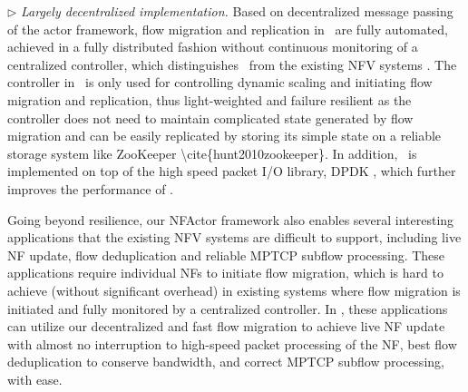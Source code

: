 

$\triangleright$ {\em Largely decentralized implementation.} Based on decentralized message passing of the actor framework, flow migration and replication in \nfactor~are fully automated, achieved in a fully distributed fashion without continuous monitoring of a centralized controller, which distinguishes \nfactor~from the existing NFV systems \cite{gember2015opennf}. The controller in \nfactor~is \ac{only used for controlling dynamic scaling and initiating flow migration and replication,}
thus light-weighted and failure resilient \ac{as the controller does not need to maintain complicated state generated by flow migration and can be easily replicated by storing its simple state on a reliable storage system like ZooKeeper \cite{hunt2010zookeeper}}.
In addition, \nfactor~is implemented on top of the high speed packet I/O library, DPDK \cite{dpdk}, which further improves the performance of \nfactor.



Going beyond resilience, our NFActor framework also enables several interesting applications that the existing NFV systems are difficult to support, including live NF update, flow deduplication and reliable MPTCP subflow processing. These applications require individual NFs to initiate flow migration, %
which is hard to achieve (without significant overhead) in existing systems where flow migration is initiated and fully monitored by a centralized controller. In \nfactor, these applications can utilize our decentralized and fast flow migration to achieve live NF update with almost no interruption to high-speed packet processing of the NF, best flow deduplication to conserve bandwidth, and correct MPTCP subflow processing, with ease. %

